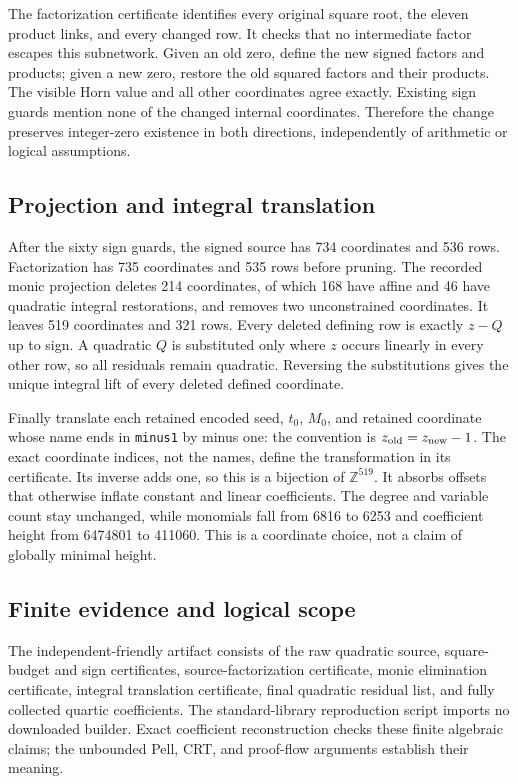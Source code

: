 The factorization certificate identifies every original square root,
the eleven product links, and every changed row.  It checks that no
intermediate factor escapes this subnetwork.  Given an old zero, define
the new signed factors and products; given a new zero, restore the old
squared factors and their products.  The visible Horn value and all
other coordinates agree exactly.  Existing sign guards mention none
of the changed internal coordinates.  Therefore the change preserves
integer-zero existence in both directions, independently of arithmetic
or logical assumptions.

\subsection{Projection and integral translation}

After the sixty sign guards, the signed source has 734 coordinates and
536 rows.  Factorization has 735 coordinates and 535 rows before pruning.
The recorded monic projection deletes 214 coordinates, of which 168 have
affine and 46 have quadratic integral restorations, and removes two
unconstrained coordinates.  It leaves 519 coordinates and 321 rows.
Every deleted defining row is exactly $z-Q$ up to sign.  A quadratic
$Q$ is substituted only where $z$ occurs linearly in every other row,
so all residuals remain quadratic.  Reversing the substitutions gives
the unique integral lift of every deleted defined coordinate.

Finally translate each retained encoded seed, $t_0$, $M_0$, and retained
coordinate whose name ends in \texttt{minus1} by minus one: the convention
is $z_{\rm old}=z_{\rm new}-1$.  The exact coordinate indices, not the
names, define the transformation in its certificate.  Its inverse adds
one, so this is a bijection of $\mathbb Z^{519}$.  It absorbs offsets
that otherwise inflate constant and linear coefficients.  The degree
and variable count stay unchanged, while monomials fall from 6816 to
6253 and coefficient height from 6474801 to 411060.  This is a coordinate
choice, not a claim of globally minimal height.

\subsection{Finite evidence and logical scope}

The independent-friendly artifact consists of the raw quadratic source,
square-budget and sign certificates, source-factorization certificate,
monic elimination certificate, integral translation certificate, final
quadratic residual list, and fully collected quartic coefficients.
The standard-library reproduction script imports no downloaded builder.
Exact coefficient reconstruction checks these finite algebraic claims;
the unbounded Pell, CRT, and proof-flow arguments establish their meaning.


